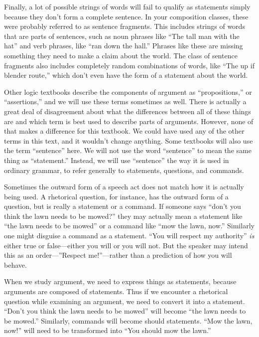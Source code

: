 Finally, a lot of possible strings of words will fail to qualify as statements simply because they don't form a complete sentence. In your composition classes, these were probably referred to as sentence fragments. This includes strings of words that are parts of sentences, such as noun phrases like ``The tall man with the hat'' and verb phrases, like ``ran down the hall.'' Phrases like these are missing something they need to make a claim about the world. The class of sentence fragments also includes completely random combinations of words, like ``The up if blender route,'' which don't even have the form of a statement about the world.  

Other logic textbooks describe the components of argument as ``propositions,'' or ``assertions,'' and we will use these terms sometimes as well.  There is actually a great deal of disagreement about what the differences between all of these things are and which term is best used to describe parts of arguments. However, none of that makes a difference for this textbook. We could have used any of the other terms in this text, and it wouldn't change anything. Some textbooks will also use the term ``sentence'' here. We will not use the word ``sentence'' to mean the same thing as ``statement.'' Instead, we will use ``sentence'' the way it is used in ordinary grammar, to refer generally to statements, questions, and commands. 

Sometimes the outward form of a speech act does not match how it is actually being used. A rhetorical question, for instance, has the outward form of a question, but is really a statement or a command. If someone says ``don't you think the lawn needs to be mowed?'' they may actually mean a statement like ``the lawn needs to be mowed'' or a command like ``mow the lawn, now.'' Similarly one might disguise a command as a statement. ``You will respect my authority'' \emph{is} either true or false---either you will or you will not. But the speaker may intend this as an order---''Respect me!''---rather than a prediction of how you will behave.

When we study argument, we need to express things as statements, because arguments are composed of statements. Thus if we encounter a rhetorical question while examining an argument, we need to convert it into a statement. ``Don't you think the lawn needs to be mowed'' will become ``the lawn needs to be mowed.'' Similarly, commands will become should statements. ``Mow the lawn, now!'' will need to be transformed into ``You should mow the lawn.'' 

